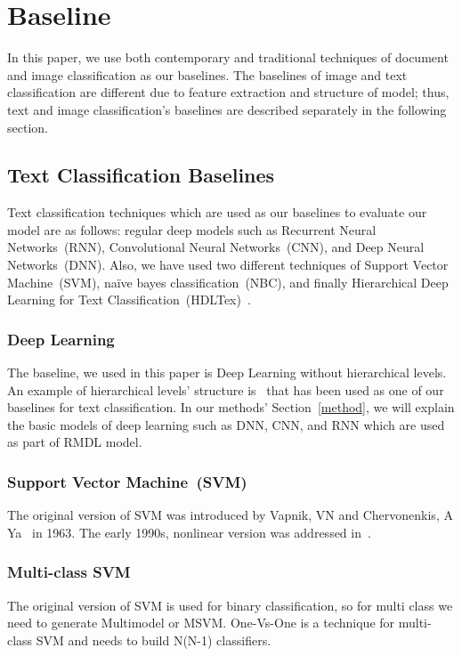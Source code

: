 \documentclass[sigconf, final]{acmart}
\begin{document}
\section{Baseline}\label{sec:baseline}
In this paper, we use both contemporary and traditional techniques of document and image classification as our baselines. The baselines of image and text classification are different due to feature extraction and structure of model; thus, text and image classification's baselines are described separately in the following section.
\subsection{Text Classification Baselines}
Text classification techniques which are used as our baselines to evaluate our model are as follows: regular deep models such as Recurrent Neural Networks~(RNN), Convolutional Neural Networks~(CNN), and Deep Neural Networks~(DNN). Also, we have used two different techniques of Support Vector Machine~(SVM), na\"{i}ve bayes classification~(NBC), and finally Hierarchical Deep Learning for Text Classification~(HDLTex)~\cite{kowsari2017HDLTex}.
\subsubsection{Deep Learning}
The baseline, we used in this paper is Deep Learning without hierarchical levels. An example of hierarchical levels' structure is~\cite{yang2016hierarchical} that has been used as one of our baselines for text classification. In our methods' Section~\ref{method}, we will explain the basic models of deep learning such as DNN, CNN, and RNN which are used as part of RMDL model. 
\subsubsection{Support Vector Machine~(SVM)}\label{me_svm}
The original version of SVM was introduced by  Vapnik, VN and Chervonenkis, A Ya~\cite{chervonenkis2013early} in 1963. The early 1990s, nonlinear version was addressed in~\cite{boser1992training}.
\subsubsection*{Multi-class SVM}
The original version of SVM is used for binary classification, so for multi class we need to generate Multimodel or MSVM. One-Vs-One is a technique for multi-class SVM and needs to build N(N-1) classifiers.
\end{document}
